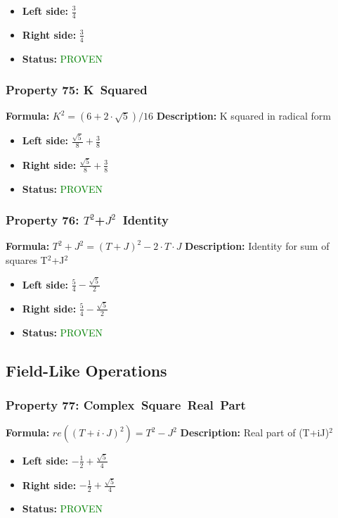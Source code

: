 \begin{itemize}
\item \textbf{Left side:} $\frac{3}{4}$
\item \textbf{Right side:} $\frac{3}{4}$
\item \textbf{Status:} \textcolor{green}{PROVEN}
\end{itemize}

\subsubsection*{Property 75: K~Squared}
\textbf{Formula:} $K^2 = (6 + 2 \cdot \sqrt{5})/16$
\textbf{Description:} K squared in radical form

\begin{itemize}
\item \textbf{Left side:} $\frac{\sqrt{5}}{8} + \frac{3}{8}$
\item \textbf{Right side:} $\frac{\sqrt{5}}{8} + \frac{3}{8}$
\item \textbf{Status:} \textcolor{green}{PROVEN}
\end{itemize}

\subsubsection*{Property 76: $T^{2}$+$J^{2}$~Identity}
\textbf{Formula:} $T^2 + J^2 = (T+J)^2 - 2 \cdot T \cdot J$
\textbf{Description:} Identity for sum of squares T$^2$+J$^2$

\begin{itemize}
\item \textbf{Left side:} $\frac{5}{4} - \frac{\sqrt{5}}{2}$
\item \textbf{Right side:} $\frac{5}{4} - \frac{\sqrt{5}}{2}$
\item \textbf{Status:} \textcolor{green}{PROVEN}
\end{itemize}


\subsection{Field-Like Operations}

\subsubsection*{Property 77: Complex~Square~Real~Part}
\textbf{Formula:} $re((T+i \cdot J)^2) = T^2-J^2$
\textbf{Description:} Real part of (T+iJ)$^2$

\begin{itemize}
\item \textbf{Left side:} $- \frac{1}{2} + \frac{\sqrt{5}}{4}$
\item \textbf{Right side:} $- \frac{1}{2} + \frac{\sqrt{5}}{4}$
\item \textbf{Status:} \textcolor{green}{PROVEN}
\end{itemize}


